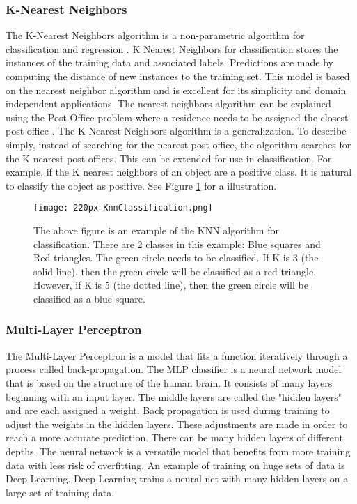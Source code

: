 \subsubsection{K-Nearest Neighbors}
The K-Nearest Neighbors algorithm is a non-parametric algorithm for classification and regression \cite{altman1992introduction}.
K Nearest Neighbors for classification stores the instances of the training data and associated labels.
Predictions are made by computing the distance of new instances to the training set.
This model is based on the nearest neighbor algorithm and is excellent for its simplicity and domain independent applications.
The nearest neighbors algorithm can be explained using the Post Office problem where a residence needs to be assigned the closest post office \cite{knuth1997art}.
The K Nearest Neighbors algorithm is a generalization.
To describe simply, instead of searching for the nearest post office, the algorithm searches for the K nearest post offices.
This can be extended for use in classification.
For example, if the K nearest neighbors of an object are a positive class. 
It is natural to classify the object as positive.
See Figure \ref{fig:knn} for a illustration.

\begin{figure}[htp]
    \centering
    \texttt{[image: 220px-KnnClassification.png]}
    \caption{The above figure is an example of the KNN algorithm for classification. There are 2 classes in this example: Blue squares and Red triangles.
    The green circle needs to be classified. If K is 3 (the solid line), then the green circle will be classified as a red triangle. 
    However, if K is 5 (the dotted line), then the green circle will be classified as a blue square.}
    \label{fig:knn}
\end{figure}


\subsubsection{Multi-Layer Perceptron}
The Multi-Layer Perceptron is a model that fits a function iteratively through a process called back-propagation.
The MLP classifier is a neural network model that is based on the structure of the human brain.
It consists of many layers beginning with an input layer.
The middle layers are called the "hidden layers" and are each assigned a weight.
Back propagation is used during training to adjust the weights in the hidden layers.
These adjustments are made in order to reach a more accurate prediction.
There can be many hidden layers of different depths.
The neural network is a versatile model that benefits from more training data with less risk of overfitting.
An example of training on huge sets of data is Deep Learning.
Deep Learning trains a neural net with many hidden layers on a large set of training data.

